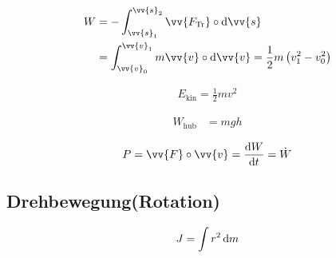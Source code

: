 \begin{boxleft}
\end{boxleft}\begin{boxrightshaded}
\begin{align}
W&=-\int_{\vv{s}_1}^{\vv{s}_2}\vv{F_{\text{Tr}}}\circ\diff \vv{s}\\
&=\int_{\vv{v}_0}^{\vv{v}_1}m\vv{v}\circ\diff \vv{v}=\frac{1}{2}m\left(v_1^2-v_0^2\right) 
\end{align}
\end{boxrightshaded}

\begin{boxleft}
\end{boxleft}\begin{boxrightshaded}
\begin{align}
E_{\text{kin}}=\frac{1}{2}mv^2
\end{align}
\end{boxrightshaded}


\begin{boxleft}
\end{boxleft}\begin{boxrightshaded}
\begin{align}
W_{\text{hub}}&=mgh
\end{align}
\end{boxrightshaded}

\begin{boxleft}
\end{boxleft}\begin{boxrightshaded}
\begin{align}
P=\vv{F}\circ\vv{v}=\frac{\diff W}{\diff t}=\dot{W}
\end{align}
\end{boxrightshaded}


\subsection{Drehbewegung(Rotation)}

\begin{boxleft}
\end{boxleft}\begin{boxrightshaded}
\begin{align}
J=\int r^2 \mathop{}\!\mathrm{d} m
\end{align}
\end{boxrightshaded}

